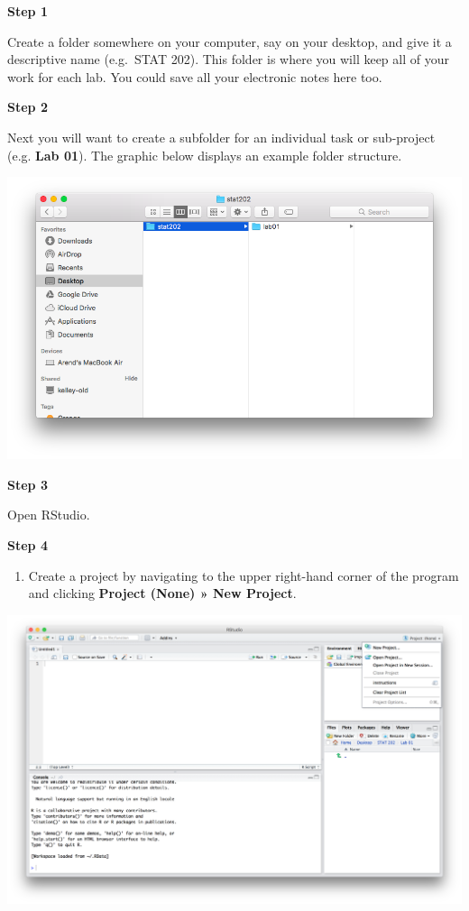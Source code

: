 \documentclass[]{book}
\providecommand{\tightlist}{%
  \setlength{\itemsep}{0pt}\setlength{\parskip}{0pt}}
\theoremstyle{definition}
\theoremstyle{definition}
\theoremstyle{definition}
\theoremstyle{remark}
\begin{document}
\textbf{Step 1}

Create a folder somewhere on your computer, say on your desktop, and
give it a descriptive name (e.g.~STAT 202). This folder is where you
will keep all of your work for each lab. You could save all your
electronic notes here too.

\textbf{Step 2}

Next you will want to create a subfolder for an individual task or
sub-project (e.g. \textbf{Lab 01}). The graphic below displays an
example folder structure.

\includegraphics{./assets/images/01-01.png}

\textbf{Step 3}

Open RStudio.

\textbf{Step 4}

\begin{enumerate}
\def\labelenumi{\arabic{enumi}.}
\setcounter{enumi}{3}
\tightlist
\item
  Create a project by navigating to the upper right-hand corner of the
  program and clicking \textbf{Project (None) » New Project}.
\end{enumerate}

\includegraphics{./assets/images/01-02.png}
\end{document}
